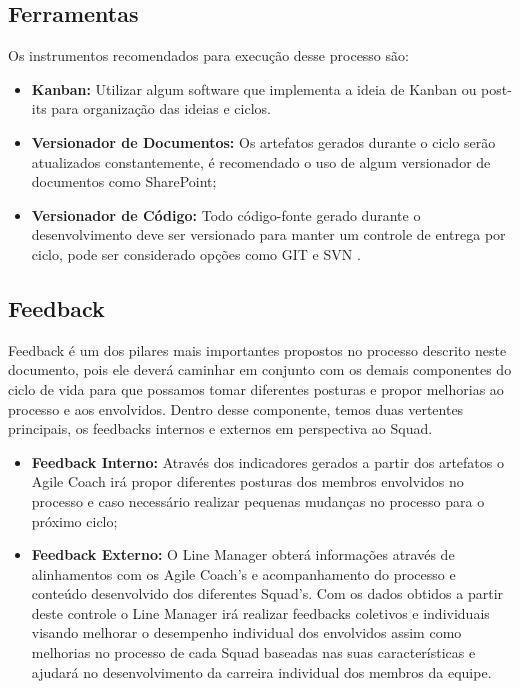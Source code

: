 \documentclass[	DIV=calc,%
							paper=a4,%
							fontsize=12pt,%
							onecolumn]{scrartcl}	 					%
\begin{document}
\subsection{Ferramentas}
Os instrumentos recomendados para execução desse processo são:
\begin{itemize}
	\item \textbf{Kanban:} Utilizar algum software que implementa a ideia de Kanban ou post-its para organização das ideias e ciclos.
	\item \textbf{Versionador de Documentos:} Os artefatos gerados durante o ciclo serão atualizados constantemente, é recomendado o uso de algum versionador de documentos como SharePoint; 
	\item \textbf{Versionador de Código:} Todo código-fonte gerado durante o desenvolvimento deve ser versionado para manter um controle de entrega por ciclo, pode ser considerado opções como GIT \cite{git} e SVN \cite{svn}.
\end{itemize}	

\subsection{Feedback}
Feedback é um dos pilares mais importantes propostos no processo descrito neste documento, pois ele deverá caminhar em conjunto com os demais componentes do ciclo de vida para que possamos tomar diferentes posturas e propor melhorias ao processo e aos envolvidos. Dentro desse componente, temos duas vertentes principais, os feedbacks internos e externos em perspectiva ao Squad. 
\begin{itemize}
	\item \textbf{Feedback Interno:} Através dos indicadores gerados a partir dos artefatos o Agile Coach irá propor diferentes posturas dos membros envolvidos no processo e caso necessário realizar pequenas mudanças no processo para o próximo ciclo;
	\item \textbf{Feedback Externo:} O Line Manager obterá informações através de alinhamentos com os Agile Coach’s e acompanhamento do processo e conteúdo desenvolvido dos diferentes Squad’s.  Com os dados obtidos a partir deste controle o Line Manager irá realizar feedbacks coletivos e individuais visando melhorar o desempenho individual dos envolvidos assim como melhorias no processo de cada Squad baseadas nas suas características e ajudará no desenvolvimento da carreira individual dos membros da equipe. 
\end{itemize}	
\end{document}
